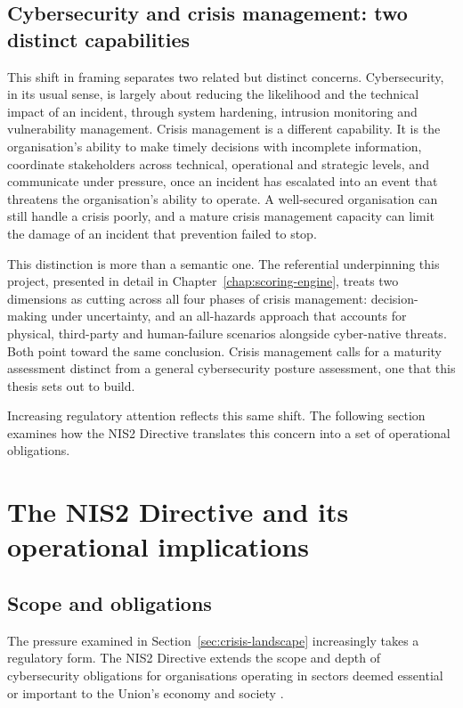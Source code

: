\subsection{Cybersecurity and crisis management: two distinct capabilities}

This shift in framing separates two related but distinct concerns.
Cybersecurity, in its usual sense, is largely about reducing the likelihood
and the technical impact of an incident, through system hardening, intrusion
monitoring and vulnerability management. Crisis management is a different
capability. It is the organisation's ability to make timely decisions with
incomplete information, coordinate stakeholders across technical,
operational and strategic levels, and communicate under pressure, once an
incident has escalated into an event that threatens the organisation's
ability to operate. A well-secured organisation can still handle a crisis
poorly, and a mature crisis management capacity can limit the damage of an
incident that prevention failed to stop.

This distinction is more than a semantic one. The referential underpinning
this project, presented in detail in Chapter~\ref{chap:scoring-engine}, treats two
dimensions as cutting across all four phases of crisis management:
decision-making under uncertainty, and an all-hazards approach that accounts
for physical, third-party and human-failure scenarios alongside cyber-native
threats. Both point toward the same conclusion. Crisis management calls for
a maturity assessment distinct from a general cybersecurity posture
assessment, one that this thesis sets out to build.

Increasing regulatory attention reflects this same shift. The following
section examines how the NIS2 Directive translates this concern into a set
of operational obligations.

\section{The NIS2 Directive and its operational implications}
\label{sec:nis2}

\subsection{Scope and obligations}

The pressure examined in Section~\ref{sec:crisis-landscape} increasingly takes a
regulatory form. The NIS2 Directive extends the scope and depth of
cybersecurity obligations for organisations operating in sectors deemed
essential or important to the Union's economy and society
\cite{nis2_directive_2022}.

